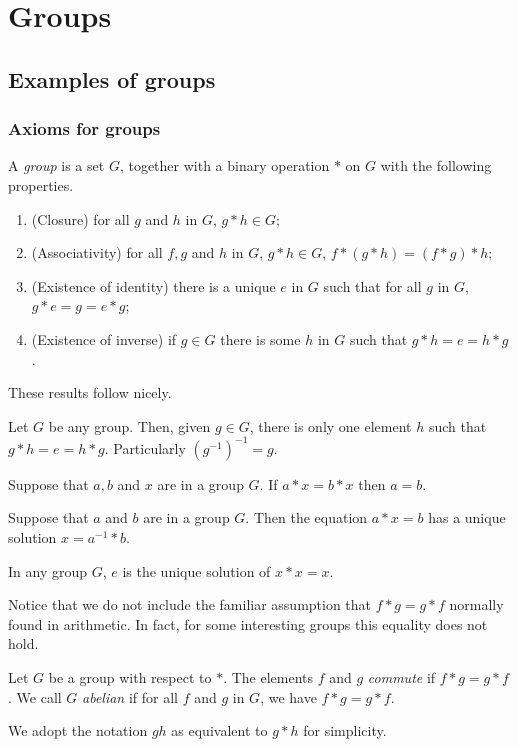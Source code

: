 \documentclass[main.tex]{subfiles}
\begin{document}
	\chapter{Groups}
		\section{Examples of groups}
			\subsection{Axioms for groups}
				\begin{definition}
					A \textit{group}  is a set $G$, together with a binary operation $\ast$ on $G$ with the following properties.
					\begin{enumerate}
						\item (Closure) for all $g$ and $h$ in $G$, $g \ast h \in G$;
						\item (Associativity) for all $f, g$ and $h$ in $G$, $g \ast h \in G$, $f\ast(g\ast h) = (f \ast g) \ast h$;
						\item (Existence of identity) there is a unique $e$ in $G$ such that for all $g$ in $G$, $g \ast e = g = e \ast g$;
						\item (Existence of inverse) if $g \in G$ there is some $h$ in $G$ such that $g \ast h = e = h \ast g$.
					\end{enumerate}
				\end{definition}
			These results follow nicely.
			\begin{lemma}
	Let $G$ be any group. Then, given $g \in G$, there is only one element $h$ such that $g \ast h = e = h \ast g $. Particularly $(g^{-1})^{-1} = g.$
			\end{lemma}
			\begin{lemma}
				Suppose that $a,b$ and $x$ are in a group $G$. If $a \ast x = b \ast x$ then $a = b$.
		\end{lemma}
				\begin{lemma}
		Suppose that $a$ and $b$ are in a group $G$. Then the equation $a \ast x = b$ has a unique solution $x = a^{-1} \ast b$.
	\end{lemma}
		\begin{lemma}
			In any group $G$, $e$ is the unique solution of $x \ast x = x$.
		\end{lemma}
		Notice that we do not include the familiar assumption that $f \ast g = g \ast f$ normally found in arithmetic. In fact, for some interesting groups this equality does not hold.
		\begin{definition}
			Let $G$ be a group with respect to $\ast$. The elements $f$ and $g$ \textit{commute} if $f \ast g = g \ast f$. We call $G$ \textit{abelian} if for all $f$ and $g$ in $G$, we have $f \ast g = g \ast f$.
		\end{definition}
		We adopt the notation $gh$ as equivalent to $g \ast h$ for simplicity.
		
\end{document}
